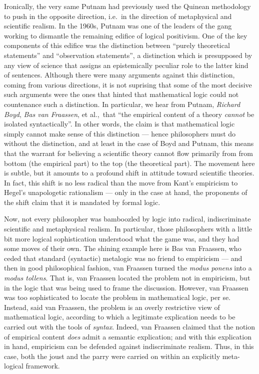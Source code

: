 Ironically, the very same Putnam had previously used the Quinean
methodology to push in the opposite direction, i.e.\ in the direction
of metaphysical and scientific realism.  In the 1960s, Putnam was one
of the leaders of the gang working to dismantle the remaining edifice
of logical positivism.  One of the key components of this edifice was
the distinction between ``purely theoretical statements'' and
``observation statements'', a distinction which is presupposed by any
view of science that assigns an epistemically peculiar role to the
latter kind of sentences.  Although there were many arguments against
this distinction, coming from various directions, it is not suprising
that some of the most decisive such arguments were the ones that
hinted that mathematical logic could not countenance such a
distinction.  In particular, we hear from Putnam, \emph{Richard Boyd},
\emph{Bas van Fraassen}, et al.,\ that ``the empirical content of a
theory {\it cannot} be isolated syntactically''.  In other words, the
claim is that mathematical logic simply cannot make sense of this
distinction --- hence philosophers must do without the distinction,
and at least in the case of Boyd and Putnam, this means that the
warrant for believing a scientific theory cannot flow primarily from
from bottom (the empirical part) to the top (the theoretical part).
The movement here is subtle, but it amounts to a profound shift in
attitude toward scientific theories.  In fact, this shift is no less
radical than the move from Kant's empiricism to Hegel's unapologetic
rationalism --- only in the case at hand, the proponents of the shift
claim that it is mandated by formal logic.

Now, not every philosopher was bamboozled by logic into radical,
indiscriminate scientific and metaphysical realism.  In particular,
those philosophers with a little bit more logical sophistication
understood what the game was, and they had some moves of their own.
The shining example here is Bas van Fraassen, who ceded that standard
(syntactic) metalogic was no friend to empiricism --- and then in good
philosophical fashion, van Fraassen turned the {\it modus ponens} into
a {\it modus tollens}.  That is, van Fraassen located the problem not
in empiricism, but in the logic that was being used to frame the
discussion.  However, van Fraassen was too sophisticated to locate the
problem in mathematical logic, per se.  Instead, said van Fraassen,
the problem is an overly restrictive view of mathematical logic,
according to which a legitimate explication needs to be carried out
with the tools of {\it syntax}.  Indeed, van Fraassen claimed that the
notion of empirical content {\it does} admit a semantic explication;
and with this explication in hand, empiricism can be defended against
indiscriminate realism.  Thus, in this case, both the joust and the
parry were carried on within an explicitly meta-logical framework.

